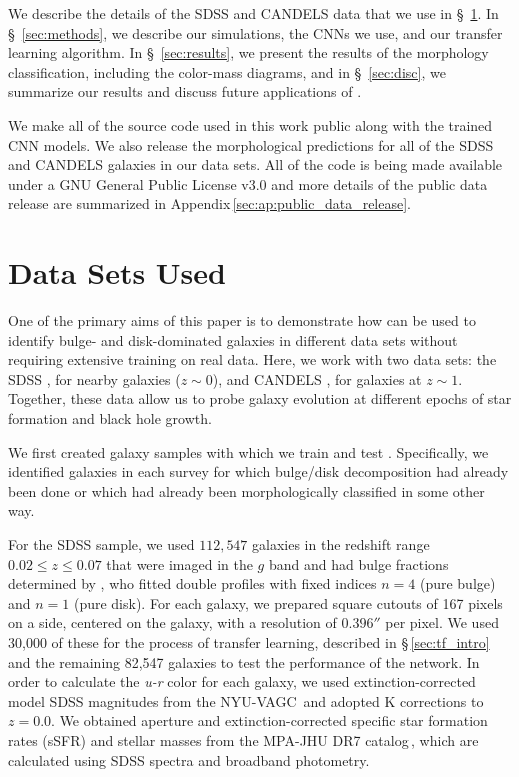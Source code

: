 We describe the details of the SDSS and CANDELS data that we use in \S~\ref{sec:data}. In \S~\ref{sec:methods}, we describe our simulations, the CNNs we use, and our transfer learning algorithm. In \S~\ref{sec:results}, we present the results of the morphology classification, including the color-mass diagrams, and in \S~\ref{sec:disc}, we summarize our results and discuss future applications of \gamornet{}.

We make all of the source code used in this work public along with the trained CNN models. We also release the \gamornet{} morphological predictions for all of the SDSS and CANDELS galaxies in our data sets. All of the code is being made available under a GNU General Public License v3.0 and more details of the public data release are summarized in Appendix\,\ref{sec:ap:public_data_release}. 

\section{Data Sets Used} \label{sec:data}

One of the primary aims of this paper is to demonstrate how \gamornet{} can be used to identify bulge- and disk-dominated galaxies in different data sets without requiring extensive training on real data. Here, we work with two data sets: the SDSS \citep{sdss_tech_summary}, for nearby galaxies ($z\sim0$), and CANDELS \citep{candels_1,candels_2}, for galaxies at $z\sim1$. Together, these data allow us to probe galaxy evolution at different epochs of star formation and black hole growth.

We first created galaxy samples with which we train and test \gamornet{}. Specifically, we identified galaxies in each survey for which bulge/disk decomposition had already been done or which had already been morphologically classified in some other way. 

For the SDSS sample, we used $112,547$ galaxies in the redshift range $ 0.02 \leq z \leq 0.07$ that were imaged in the $g$ band and had bulge fractions determined by \citet{simard_11}, who fitted double \sersic{} profiles with fixed indices $n = 4$ (pure bulge) and $n=1$ (pure disk). For each galaxy, we prepared square cutouts of 167 pixels on a side, centered on the galaxy, with a resolution of $0.396''$ per pixel. We used 30,000 of these for the process of transfer learning, described in \S\,\ref{sec:tf_intro} and the remaining 82,547 galaxies to test the performance of the network. In order to calculate the \textit{u-r} color for each galaxy, we used extinction-corrected model SDSS magnitudes from the NYU-VAGC\,\citep{nyu_vagc_des} and adopted K corrections to $z=0.0$. We obtained aperture and extinction-corrected specific star formation rates (sSFR) and stellar masses from the MPA-JHU DR7 catalog\,\citep{mpa_jhu_2,mpa_jhu_1}, which are calculated using SDSS spectra and broadband photometry. 


